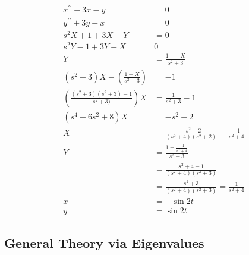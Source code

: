 \documentclass[fleqn,letterpaper]{report}
\begin{document}
\begin{align*}
x^{\prime \prime} + 3x - y & = 0 \\
y^{\prime \prime} + 3y - x & = 0 \\
s^2X + 1 + 3X - Y & = 0 \\
s^2Y - 1 + 3Y - X & 0 \\
Y & = \frac{1++X}{s^2+3} \\
(s^2+3) X - \left( \frac{1+X}{s^2+3} \right) & = - 1\\
\left( \frac{(s^2+3)(s^2+3) - 1}{s^2+3)} \right) X & = \frac{1}{s^2+3} -
1 \\
(s^4+6s^2+8)X & = -s^2-2 \\
X & = \frac{-s^2-2}{(s^2+4)(s^2+2)} = \frac{-1}{s^2+4} \\
Y & = \frac{1 + \frac{-1}{s^2+4}}{s^2+3} \\
& = \frac{s^2+4-1}{(s^2+4)(s^2+3)} \\
&= \frac{s^2+3}{(s^2+4)(s^2+3)} = \frac{1}{s^2+4} \\
x & = -\sin 2t \\
y & = \sin 2t
\end{align*}

\subsection{General Theory via Eigenvalues}
\label{general-theory}
\end{document}
